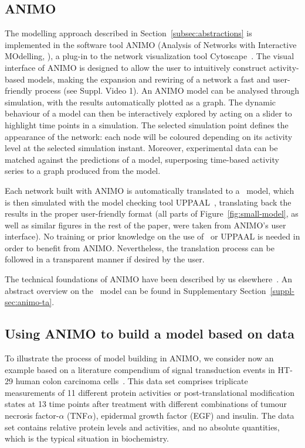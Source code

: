 \subsection{ANIMO}
The modelling approach described in Section~\ref{subsec:abstractions} is implemented in the
software tool ANIMO (Analysis of Networks with Interactive MOdelling, \citealt{animo-bibe}),
a plug-in to the network visualization tool Cytoscape~\citep{cytoscape}. The visual interface of ANIMO
is designed to allow the user to intuitively construct activity-based models, making the expansion
and rewiring of a network a fast and user-friendly process (see Suppl. Video 1). An ANIMO model can
be analysed through simulation, with the results automatically plotted as a graph.
The dynamic behaviour of a model can then be interactively explored by
acting on a slider to highlight time points in a simulation. The selected simulation
point defines the appearance of the network: each node will be coloured depending on its activity level
at the selected simulation instant. Moreover, experimental data can be matched against
the predictions of a model, superposing time-based activity series to a graph produced from the model.


Each network built with ANIMO is automatically translated to
a \tas\ model, which is then simulated with the model checking tool UPPAAL~\citep{uppaal},
translating back the results in the proper user-friendly format
(all parts of Figure~\ref{fig:small-model}, as well as similar figures
in the rest of the paper, were taken from ANIMO's user interface).
No training
or prior knowledge on the use of \tas\ or UPPAAL is needed in order to benefit from ANIMO.
Nevertheless, the translation process can be followed in a transparent manner if
desired by the user.

The technical foundations of ANIMO have been described by us elsewhere~\citep{animo-bibe}. 
An abstract overview on the \tas\ model can be found in Supplementary Section~\ref{suppl-sec:animo-ta}.


\subsection{Using ANIMO to build a model based on data}\label{subsec:case-study}
To illustrate the process of model building in ANIMO, we consider now an example based on a literature compendium of
signal transduction events in HT-29 human colon carcinoma cells~\citep{pathway-compendium}. This data set comprises triplicate
measurements of 11 different protein activities or post-translational modification states at 13 time points after
treatment with different combinations of tumour necrosis factor-$\alpha$ (TNF$\alpha$), epidermal growth factor (EGF) and insulin.
The data set contains relative protein levels and activities, and no absolute quantities, which is the typical situation in biochemistry.

